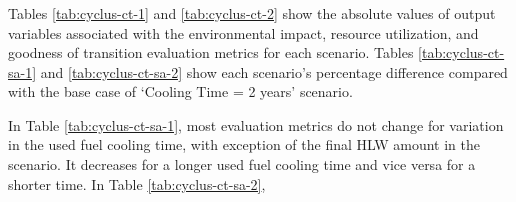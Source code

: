 \begin{table}[H]
        \end{table}

    
\subsubsection{\textbf{\Cyclus}}

Tables \ref{tab:cyclus-ct-1} and \ref{tab:cyclus-ct-2} show 
the absolute values of 
output variables associated with the environmental impact, 
resource utilization, and goodness of transition evaluation 
metrics for each scenario. 
Tables \ref{tab:cyclus-ct-sa-1} and \ref{tab:cyclus-ct-sa-2} 
show each scenario's percentage 
difference compared with the base case of `Cooling Time = 2 years'
scenario.

In Table \ref{tab:cyclus-ct-sa-1}, most evaluation metrics do not change 
for variation in the used fuel cooling time, with exception of the final 
HLW amount in the scenario. 
It decreases for a longer used fuel cooling time and vice versa for a 
shorter time. 
In Table \ref{tab:cyclus-ct-sa-2}, 

